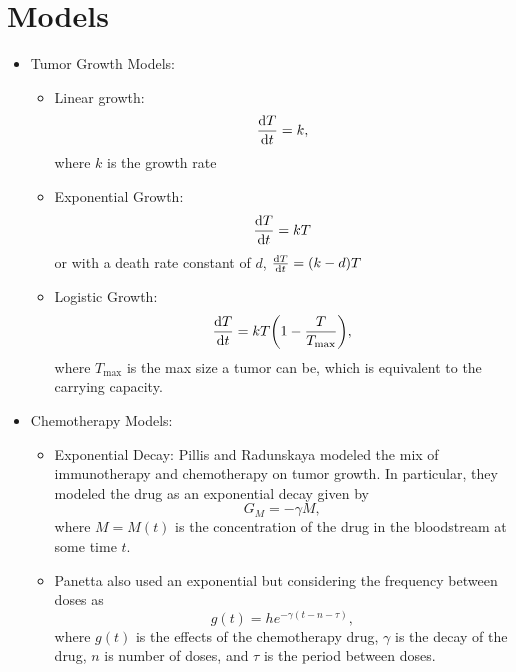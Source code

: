 \documentclass[11pt]{amsart}
\begin{document}
\section{Models}
\label{appendix: models}
\begin{itemize}

	\item Tumor Growth Models:
		\begin{itemize}
	\item Linear growth: 
		\begin{equation}
			\frac{\mathop{}\!\mathrm{d} T}{\mathop{}\!\mathrm{d} t} = k,
			\label{eq: lin}
		\end{equation}
		where $k$ is the growth rate
	\item Exponential Growth:
		\begin{equation}
			\frac{\mathop{}\!\mathrm{d} T}{\mathop{}\!\mathrm{d} t} = kT \label{eq: exp}
		\end{equation}
	 or with a death rate constant of $d$, $\frac{\mathop{}\!\mathrm{d} T}{\mathop{}\!\mathrm{d} t} = (k-d)T$
	\item Logistic Growth: 
		\begin{equation}
			\frac{\mathop{}\!\mathrm{d} T}{\mathop{}\!\mathrm{d} t} = kT \biggl(1- \frac{T}{T_{\max}}\biggr)\label{eq: logistic},
		\end{equation}
		where $T_{\max}$ is the max size a tumor can be, which is equivalent to the carrying capacity.
		\end{itemize}
		
	\item Chemotherapy Models: 
		\begin{itemize}
			\item Exponential Decay: Pillis and Radunskaya modeled the mix of immunotherapy and chemotherapy on tumor growth. In particular, they modeled the drug as an exponential decay given by 
				\begin{equation}
					G_M = -\gamma M \label{eq: Pillis},
				\end{equation}
				where $M=M(t)$ is the concentration of the drug in the bloodstream at some time $t$.
				
			\item Panetta also used an exponential but considering the frequency between doses as
				\begin{equation}
					g(t) = h e^{-\gamma(t-n-\tau)} \label{eq:PanettaExpDec},
				\end{equation}
				where $g(t)$ is the effects of the chemotherapy drug, $\gamma$ is the decay of the drug, $n$ is number of doses, and $\tau$ is the period between doses.
				

\end{itemize}
\end{itemize}
\end{document}
